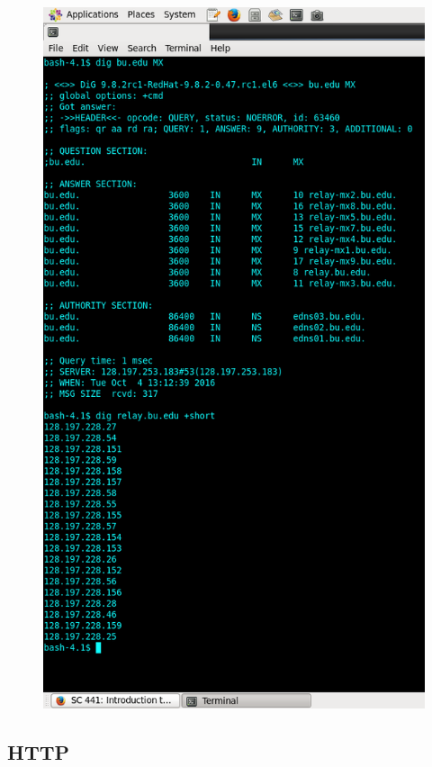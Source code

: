 \documentclass[12pt]{article}
\begin{document}
\begin{enumerate}[label=\textbf{Question \arabic*)}]
\begin{figure}[h]
			\centering
			\includegraphics[scale=0.5]{dig}
		\end{figure}
\end{enumerate}

\subsection{HTTP}
\end{document}
